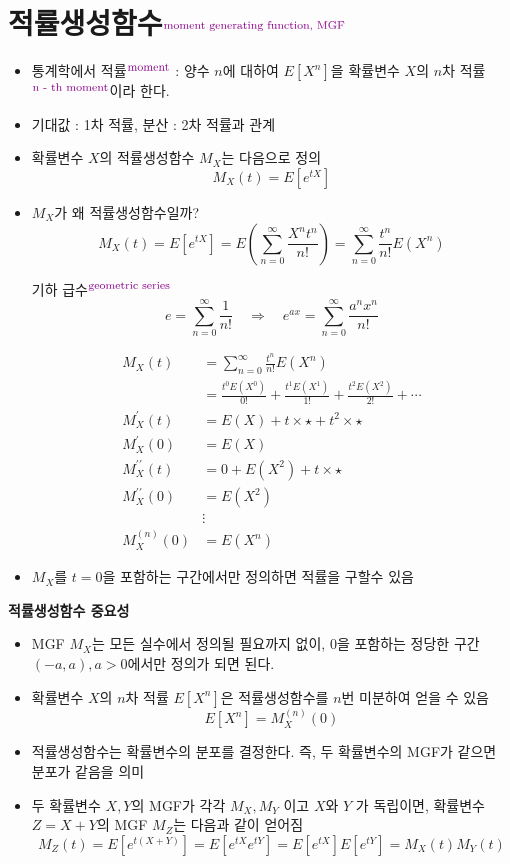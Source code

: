 \documentclass{oblivoir}
\newcommand{\DC}[1]{\textcolor{DarkMagenta}{#1}}%
\newcommand{\UP}[1]{$^{\mbox{\DC{\footnotesize #1}}}$}
\begin{document}
\section{적률생성함수\UP{moment generating function, MGF}}
\begin{itemize}
\item 통계학에서 적률\UP{moment} : 
양수 $n$에 대하여 $E[X^n]$을 확률변수 $X$의 $n$차 적률\UP{n - th moment}이라 한다.
\item 기대값 : 1차 적률, 분산 : 2차 적률과 관계
\item 확률변수 $X$의 적률생성함수 $M_X$는 다음으로 정의
$$
M_X(t) = E[e^{tX}]
$$
\item $M_X$가 왜 적률생성함수일까?
$$
M_X(t) = E[e^{tX}] = E \left( \sum_{n=0}^{\infty} \frac{X^n t^n}{n!} \right) = \sum_{n=0}^{\infty} \frac{t^n}{n!} E(X^n)
$$
\begin{myframe}{기하 급수\UP{geometric series}}
$$
e = \sum_{n=0}^{\infty} \frac{1}{n!} \quad  \Rightarrow \quad e^{ax} = \sum_{n=0}^{\infty} \frac{a^n x^n}{n!}
$$
\end{myframe}
\begin{align*}
M_X(t) &= \sum_{n=0}^{\infty} \frac{t^n}{n!} E(X^n) \\
&= \frac{t^0 E(X^0)}{0!} + \frac{t^1 E(X^1)}{1!} + \frac{t^2 E(X^2)}{2!} + \cdots \\
M_X^{\prime} (t) &= E(X) + t \times \star + t^2 \times \star \\
M_X^{\prime} (0) &= E(X) \\
M_X^{\prime\prime} (t) &= 0 + E(X^2) + t \times \star \\
M_X^{\prime\prime} (0) &= E(X^2) \\
&\vdots \\
M_X^{(n)} (0) &= E(X^n)
\end{align*}
\item $M_X$를 $t=0$을 포함하는 구간에서만 정의하면 적률을 구할수 있음
\end{itemize}

\textbf{적률생성함수 중요성}
\begin{itemize}
\item MGF $M_X$는 모든 실수에서 정의될 필요까지 없이, 0을 포함하는 정당한 구간 $(-a,a), a>0$에서만 정의가 되면 된다.
\item 확률변수 $X$의 $n$차 적률 $E[X^n]$은 적률생성함수를  $n$번 미분하여 얻을 수 있음
$$
E[X^n] = M_X^{(n)}(0)
$$
\item 적률생성함수는 확률변수의 분포를 결정한다. 즉, 두 확률변수의 MGF가 같으면 분포가 같음을 의미
\item 두 확률변수 $X,Y$의 MGF가 각각 $M_X, M_Y$ 이고 $X$와 $Y$ 가 독립이면, 확률변수 $Z = X + Y$의 MGF $M_Z$는 다음과 같이 얻어짐
$$
M_Z(t) = E[e^{t(X+Y)}] = E[e^{tX}e^{tY}] = E[e^{tX}]E[e^{tY}] =  M_X(t) M_Y(t)
$$
\end{itemize}
\end{document}
